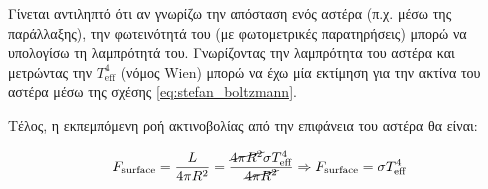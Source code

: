Γίνεται αντιληπτό ότι αν γνωρίζω την απόσταση ενός αστέρα (π.χ. μέσω της παράλλαξης), την φωτεινότητά του (με φωτομετρικές παρατηρήσεις) μπορώ να υπολογίσω τη λαμπρότητά του. Γνωρίζοντας την λαμπρότητα του αστέρα και μετρώντας την $T_{\text{eff}}^4$ (νόμος Wien) μπορώ να έχω μία εκτίμηση για την ακτίνα του αστέρα μέσω της σχέσης \eqref{eq:stefan_boltzmann}.

Τέλος, η εκπεμπόμενη ροή ακτινοβολίας από την επιφάνεια του αστέρα θα είναι:

\begin{eqnarray}
    F_{\text{surface}} = \frac{L}{4 \pi R^2} = \frac{\cancel{4 \pi R^2} \sigma T_{\text{eff}}^4}{\cancel{4 \pi R^2}} \Rightarrow F_{\text{surface}} = \sigma T_{\text{eff}}^4
\end{eqnarray}

